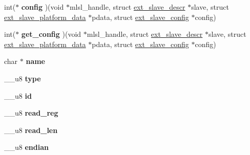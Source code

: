 \begin{DoxyCompactItemize}
\item 
\hypertarget{structext__slave__descr_a6b208b301842b552901c10b7492fb5ab}{}int($\ast$ {\bfseries config} )(void $\ast$mlsl\+\_\+handle, struct \hyperlink{structext__slave__descr}{ext\+\_\+slave\+\_\+descr} $\ast$slave, struct \hyperlink{structext__slave__platform__data}{ext\+\_\+slave\+\_\+platform\+\_\+data} $\ast$pdata, struct \hyperlink{structext__slave__config}{ext\+\_\+slave\+\_\+config} $\ast$config)\label{structext__slave__descr_a6b208b301842b552901c10b7492fb5ab}

\item 
\hypertarget{structext__slave__descr_ac0de50c3eb7be2b34fb0b4f9ed0e6f8f}{}int($\ast$ {\bfseries get\+\_\+config} )(void $\ast$mlsl\+\_\+handle, struct \hyperlink{structext__slave__descr}{ext\+\_\+slave\+\_\+descr} $\ast$slave, struct \hyperlink{structext__slave__platform__data}{ext\+\_\+slave\+\_\+platform\+\_\+data} $\ast$pdata, struct \hyperlink{structext__slave__config}{ext\+\_\+slave\+\_\+config} $\ast$config)\label{structext__slave__descr_ac0de50c3eb7be2b34fb0b4f9ed0e6f8f}

\item 
\hypertarget{structext__slave__descr_ad22f4cb50bb1d291335c022aa96f039d}{}char $\ast$ {\bfseries name}\label{structext__slave__descr_ad22f4cb50bb1d291335c022aa96f039d}

\item 
\hypertarget{structext__slave__descr_a60a89691c1804ce232f7e91072dba000}{}\+\_\+\+\_\+u8 {\bfseries type}\label{structext__slave__descr_a60a89691c1804ce232f7e91072dba000}

\item 
\hypertarget{structext__slave__descr_ab6298173756756e76dbeacb8c2ec1988}{}\+\_\+\+\_\+u8 {\bfseries id}\label{structext__slave__descr_ab6298173756756e76dbeacb8c2ec1988}

\item 
\hypertarget{structext__slave__descr_aa0f31db238422dd8d644d05c3b42623c}{}\+\_\+\+\_\+u8 {\bfseries read\+\_\+reg}\label{structext__slave__descr_aa0f31db238422dd8d644d05c3b42623c}

\item 
\hypertarget{structext__slave__descr_acc3c2b8dbc91cd739cc0380c2039904f}{}\+\_\+\+\_\+u8 {\bfseries read\+\_\+len}\label{structext__slave__descr_acc3c2b8dbc91cd739cc0380c2039904f}

\item 
\hypertarget{structext__slave__descr_a9add704f7d94dbd84c2cd184da4e052f}{}\+\_\+\+\_\+u8 {\bfseries endian}\label{structext__slave__descr_a9add704f7d94dbd84c2cd184da4e052f}


\end{DoxyCompactItemize}
